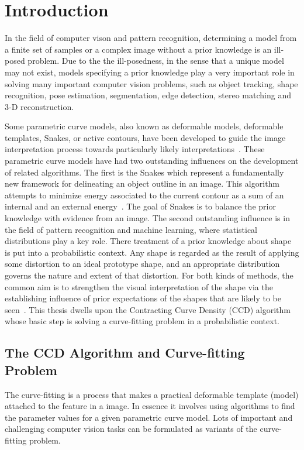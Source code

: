 \chapter{Introduction}
\label{chapter:Introduction}
In the field of computer vison and pattern recognition, determining a
model from a finite set of samples or a complex image without a prior
knowledge is an ill-posed problem. Due to the the ill-posedness, in
the sense that a unique model may not exist, models specifying a prior
knowledge play a very important role in solving many important
computer vision problems, such as object tracking, shape recognition,
pose estimation, segmentation, edge detection, stereo matching and 3-D
reconstruction.

Some parametric curve models, also known as deformable models,
deformable templates, Snakes, or active contours, have been developed
to guide the image interpretation process towards particularly
likely interpretations~\cite{hanek2004fitting}. These parametric curve
models have had two outstanding influences on the
development of related algorithms. The first is the Snakes which
represent a fundamentally new framework for delineating an object
outline in an image. This algorithm attempts to minimize energy
associated to the current contour as a sum of an internal and an external
energy~\cite{kass1988snakes}. The goal of Snakes is to balance the prior
knowledge with evidence from an image. The second outstanding
influence is in the field of pattern recognition and machine learning,
where statistical distributions play a key role.  There treatment
of a prior knowledge about shape is put into a probabilistic
context. Any shape is regarded as the result of applying some
distortion to an ideal prototype shape, and an appropriate
distribution governs the nature and extent of that distortion.
For both kinds of methods, the common aim is to strengthen the visual
interpretation of the shape via the establishing influence of prior
expectations of the shapes that are likely to be
seen~\cite{blake1998active}. This thesis dwells upon the Contracting
Curve Density (CCD) algorithm whose basic step is solving a
curve-fitting problem in a probabilistic context.


\section{The CCD Algorithm and Curve-fitting Problem}
\label{sec:ccdcfp}
The curve-fitting is a process that makes
a practical deformable template (model) attached to the feature in a
image. In essence it involves using algorithms to find the parameter
values for a given parametric curve model. Lots of important and
challenging computer vision tasks can be formulated as variants of the
curve-fitting problem. 

